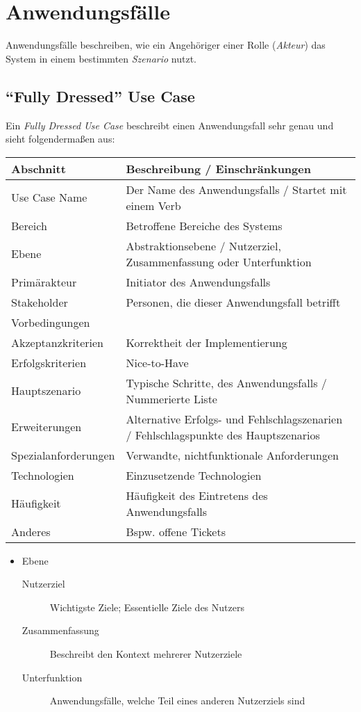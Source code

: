 \documentclass[a4paper, 11pt, accentcolor = tud3b]{tudreport}
\begin{document}
		\section{Anwendungsfälle}
			Anwendungsfälle beschreiben, wie ein Angehöriger einer Rolle (\textit{Akteur}) das System in einem bestimmten \textit{Szenario} nutzt.
			
			\subsection{\enquote{Fully Dressed} Use Case}
				Ein \textit{Fully Dressed Use Case} beschreibt einen Anwendungsfall sehr genau und sieht folgendermaßen aus:
				
				\begin{table}[ht]
					\begin{tabular}{l l}
						Abschnitt & Beschreibung / Einschränkungen \\
						\hline
						Use Case Name & Der Name des Anwendungsfalls / Startet mit einem Verb \\
						Bereich & Betroffene Bereiche des Systems \\
						Ebene & Abstraktionsebene / Nutzerziel, Zusammenfassung oder Unterfunktion \\
						Primärakteur & Initiator des Anwendungsfalls \\
						Stakeholder & Personen, die dieser Anwendungsfall betrifft \\
						Vorbedingungen & \\
						Akzeptanzkriterien & Korrektheit der Implementierung \\
						Erfolgskriterien & Nice-to-Have \\
						Hauptszenario & Typische Schritte, des Anwendungsfalls / Nummerierte Liste \\
						Erweiterungen & Alternative Erfolgs- und Fehlschlagszenarien / Fehlschlagspunkte des Hauptszenarios \\
						Spezialanforderungen & Verwandte, nichtfunktionale Anforderungen \\
						Technologien & Einzusetzende Technologien \\
						Häufigkeit & Häufigkeit des Eintretens des Anwendungsfalls \\
						Anderes & Bspw. offene Tickets \\
					\end{tabular}
					
					\begin{itemize}
						\item Ebene
							\begin{description}
								\item[Nutzerziel] Wichtigste Ziele; Essentielle Ziele des Nutzers
								\item[Zusammenfassung] Beschreibt den Kontext mehrerer Nutzerziele
								\item[Unterfunktion] Anwendungsfälle, welche Teil eines anderen Nutzerziels sind
							\end{description}
					\end{itemize}
				\end{table}
			
\end{document}
